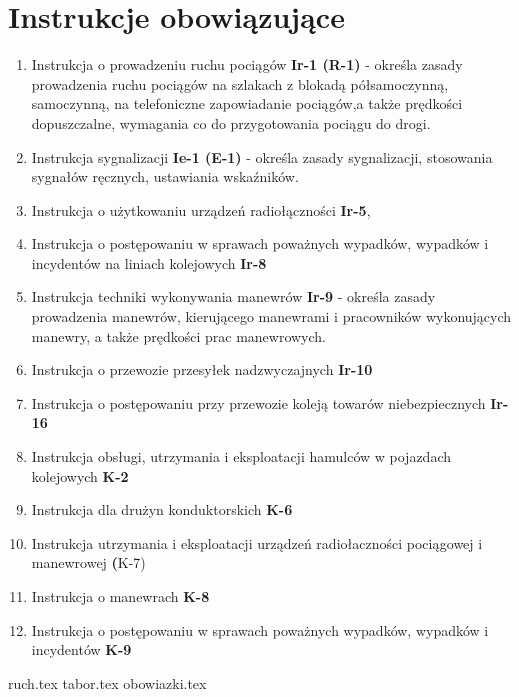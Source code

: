 \documentclass[usenames,dvipsnames,svgnames,table,a4paper,openany,justified]{tufte-book}
\begin{document}
\chapter{Instrukcje obowiązujące}
\begin{enumerate}
	\item Instrukcja o prowadzeniu ruchu pociągów \textbf{Ir-1 (R-1)} - określa zasady prowadzenia ruchu pociągów na szlakach z blokadą półsamoczynną, samoczynną, na telefoniczne zapowiadanie pociągów,a także prędkości dopuszczalne, wymagania co do przygotowania pociągu do drogi.
	\item Instrukcja sygnalizacji \textbf{Ie-1 (E-1)} - określa zasady sygnalizacji, stosowania sygnałów ręcznych, ustawiania wskaźników.
	\item Instrukcja o użytkowaniu urządzeń radiołączności \textbf{Ir-5},
	\item Instrukcja o postępowaniu w sprawach poważnych wypadków, wypadków i incydentów na liniach kolejowych \textbf{Ir-8}
	\item Instrukcja techniki wykonywania manewrów \textbf{Ir-9} - określa zasady prowadzenia manewrów, kierującego manewrami i pracowników wykonujących manewry, a także prędkości prac manewrowych.
	\item Instrukcja o przewozie przesyłek nadzwyczajnych \textbf{Ir-10}
	\item Instrukcja o postępowaniu przy przewozie koleją towarów niebezpiecznych \textbf{Ir-16}
	\item Instrukcja obsługi, utrzymania i eksploatacji hamulców w pojazdach kolejowych \textbf{K-2}
	\item Instrukcja dla drużyn konduktorskich \textbf{K-6}
	\item Instrukcja utrzymania i eksploatacji urządzeń radiołaczności pociągowej i manewrowej \textbf(K-7)
	\item Instrukcja o manewrach \textbf{K-8}
	\item Instrukcja o postępowaniu w sprawach poważnych wypadków, wypadków i incydentów \textbf{K-9}
\end{enumerate}
 
	{ruch.tex}
	{tabor.tex}
	{obowiazki.tex}
	\printglossaries
	\tableofcontents
\end{document}
